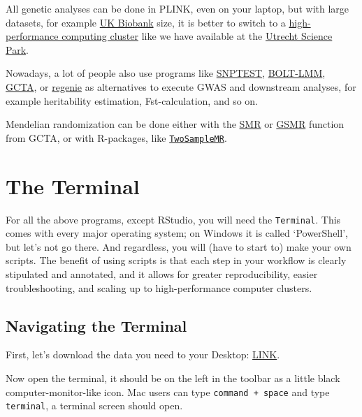 \documentclass[
]{book}
\begin{document}
All genetic analyses can be done in PLINK, even on your laptop, but with large datasets, for example \href{https://www.ukbiobank.ac.uk}{UK Biobank} size, it is better to switch to a \href{https://en.wikipedia.org/wiki/High-performance_computing}{high-performance computing cluster} like we have available at the \href{https://wiki.bioinformatics.umcutrecht.nl/bin/view/HPC/WebHome}{Utrecht Science Park}.

Nowadays, a lot of people also use programs like \href{snptest}{SNPTEST}, \href{https://data.broadinstitute.org/alkesgroup/BOLT-LMM/}{BOLT-LMM}, \href{http://cnsgenomics.com/software/gcta/\#Overview}{GCTA}, or \href{https://rgcgithub.github.io/regenie/}{regenie} as alternatives to execute GWAS and downstream analyses, for example heritability estimation, Fst-calculation, and so on.

Mendelian randomization can be done either with the \href{http://cnsgenomics.com/software/smr/\#Overview}{SMR} or \href{http://cnsgenomics.com/software/gsmr/}{GSMR} function from GCTA, or with R-packages, like \href{https://mrcieu.github.io/TwoSampleMR/}{\texttt{TwoSampleMR}}.

\hypertarget{the-terminal}{%
\section{The Terminal}\label{the-terminal}}

For all the above programs, except RStudio, you will need the \texttt{Terminal}. This comes with every major operating system; on Windows it is called `PowerShell', but let's not go there. And regardless, you will (have to start to) make your own scripts. The benefit of using scripts is that each step in your workflow is clearly stipulated and annotated, and it allows for greater reproducibility, easier troubleshooting, and scaling up to high-performance computer clusters.

\hypertarget{navigating-the-terminal}{%
\subsection{Navigating the Terminal}\label{navigating-the-terminal}}

First, let's download the data you need to your Desktop: \href{}{LINK}.

Now open the terminal, it should be on the left in the toolbar as a little black computer-monitor-like icon.
Mac users can type \texttt{command\ +\ space} and type \texttt{terminal}, a terminal screen should open.
\end{document}
